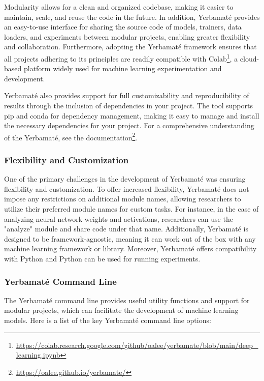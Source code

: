Modularity allows for a clean and organized codebase, making it easier to maintain, scale, and reuse the code in the future. In addition, Yerbamaté provides an easy-to-use interface for sharing the source code of models, trainers, data loaders, and experiments between modular projects, enabling greater flexibility and collaboration. Furthermore, adopting the Yerbamaté framework ensures that all projects adhering to its principles are readily compatible with Colab\footnote{\url{https://colab.research.google.com/github/oalee/yerbamate/blob/main/deep_learning.ipynb}}, a cloud-based platform widely used for machine learning experimentation and development.

Yerbamaté also provides support for full customizability and reproducibility of results through the inclusion of dependencies in your project. The tool supports pip and conda for dependency management, making it easy to manage and install the necessary dependencies for your project.
For a comprehensive understanding of the Yerbamaté, see the documentation\footnote{\url{https://oalee.github.io/yerbamate/}}.


\subsubsection{Flexibility and Customization}
One of the primary challenges in the development of Yerbamaté was ensuring flexibility and customization.
To offer increased flexibility, Yerbamaté does not impose any restrictions on additional module names, allowing researchers to utilize their preferred module names for custom tasks. For instance, in the case of analyzing neural network weights and activations, researchers can use the "analyze" module and share code under that name.  Additionally, Yerbamaté is designed to be framework-agnostic, meaning it can work out of the box with any machine learning framework or library.  Moreover, Yerbamaté offers compatibility with Python and Python can be used for running experiments. 



\subsubsection{Yerbamaté Command Line}
The Yerbamaté command line provides useful utility functions and support for modular projects, which can facilitate the development of machine learning models.
Here is a list of the key Yerbamaté command line options:

